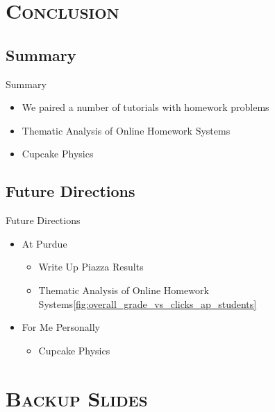 \documentclass[xcolor=x11names,compress]{beamer}
\begin{document}

\section{\scshape Conclusion}

\subsection{Summary}
\begin{frame}{Summary}
    \begin{itemize}
        \item We paired a number of tutorials with homework problems
        \item Thematic Analysis of Online Homework Systems
        \item Cupcake Physics
    \end{itemize}
\end{frame}

\subsection{Future Directions}
\begin{frame}{Future Directions}
    \begin{itemize}
        \item At Purdue
        \begin{itemize}
            \item Write Up Piazza Results
            \item Thematic Analysis of Online Homework Systems\ref{fig:overall_grade_vs_clicks_ap_students}
        \end{itemize}
        \vspace{3mm}
        \item For Me Personally
        \begin{itemize}
            \item Cupcake Physics
        \end{itemize}
    \end{itemize}
\end{frame}

\appendix
\section{\scshape Backup Slides}
\end{document}
